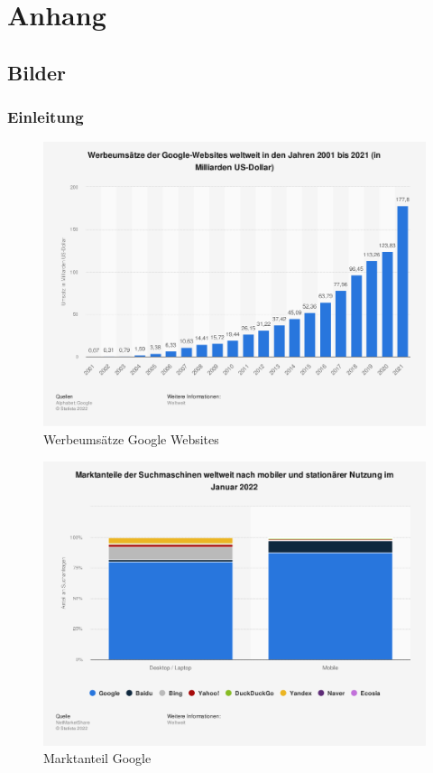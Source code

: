 \appendix
{}
\renewcommand{\thechapter}{\Alph{chapter}}
\renewcommand{\thesection}{\Roman{section}}
\renewcommand{\thesubsection}{\Roman{subsection}}
\renewcommand\floatpagefraction{0.1}
\clearpage
\chapter{Anhang}
\label{appendix:annex}

\section{Bilder}
\label{annex:images}

\subsection{Einleitung}

\begin{figure}[ht!]
  \begin{centering}
    \includegraphics[width=.75\textwidth]{figures/appendix/werbeumsatz.png}
    \caption{Werbeumsätze Google Websites \cite{alphabet2022}}
    \label{fig:werbeumsatz}
  \end{centering}
\end{figure}

\begin{figure}[ht!]
  \begin{centering}
    \includegraphics[width=.75\textwidth]{figures/appendix/marketshare.png}
    \caption{Marktanteil Google \cite{netmarketshare2022}}
    \label{fig:marketshare}
  \end{centering}
\end{figure}

